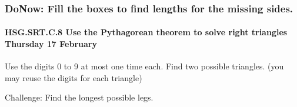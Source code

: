 \documentclass{beamer}
\begin{document}
\frame
{
  \frametitle{DoNow: Fill the boxes to find lengths for the missing sides.}
  \framesubtitle{HSG.SRT.C.8 Use the Pythagorean theorem to solve right triangles \hfill \alert{Thursday 17 February}}
  Use the digits 0 to 9 at most one time each. Find two possible triangles. (you may reuse the digits for each triangle)
\begin{center}
  \end{center}
    Challenge: Find the longest possible legs.
}
\end{document}
